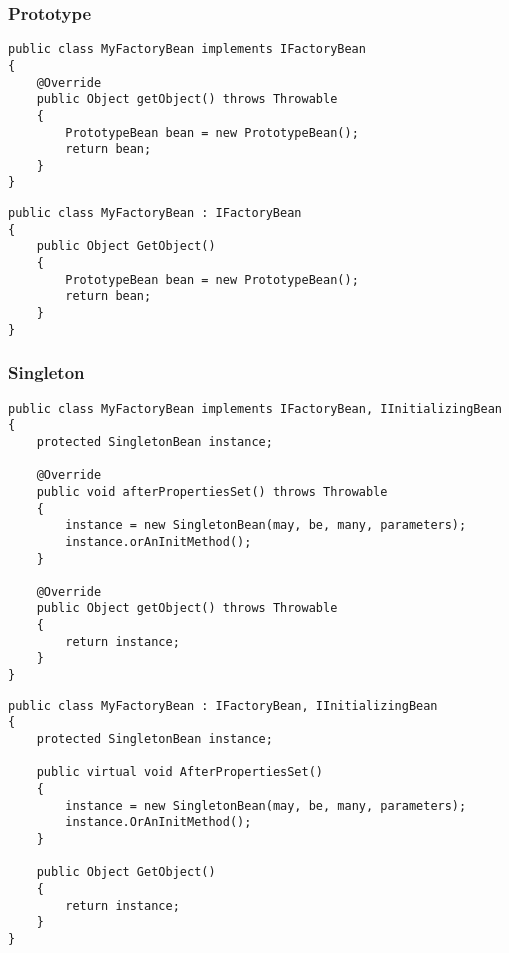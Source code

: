 \subsubsection{Prototype}
\begin{lstlisting}[style=Java,caption={Usage example for \type{IFactoryBean} creating one instance per call (Java)}]
public class MyFactoryBean implements IFactoryBean
{
	@Override
	public Object getObject() throws Throwable
	{
		PrototypeBean bean = new PrototypeBean();
		return bean;
	}
}
\end{lstlisting}
\begin{lstlisting}[style=Csharp,caption={Usage example for \type{IFactoryBean} creating one instance per call (C\#)}]
public class MyFactoryBean : IFactoryBean
{
	public Object GetObject()
	{
		PrototypeBean bean = new PrototypeBean();
		return bean;
	}
}
\end{lstlisting}

\subsubsection{Singleton}
\begin{lstlisting}[style=Java,caption={Usage example for \type{IFactoryBean} returning a singleton (Java)}]
public class MyFactoryBean implements IFactoryBean, IInitializingBean
{
	protected SingletonBean instance;

	@Override
	public void afterPropertiesSet() throws Throwable
	{
		instance = new SingletonBean(may, be, many, parameters);
		instance.orAnInitMethod();
	}

	@Override
	public Object getObject() throws Throwable
	{
		return instance;
	}
}
\end{lstlisting}
\begin{lstlisting}[style=Csharp,caption={Usage example for \type{IFactoryBean} returning a singleton (C\#)}]
public class MyFactoryBean : IFactoryBean, IInitializingBean
{
	protected SingletonBean instance;

	public virtual void AfterPropertiesSet()
	{
		instance = new SingletonBean(may, be, many, parameters);
		instance.OrAnInitMethod();
	}

	public Object GetObject()
	{
		return instance;
	}
}
\end{lstlisting}
